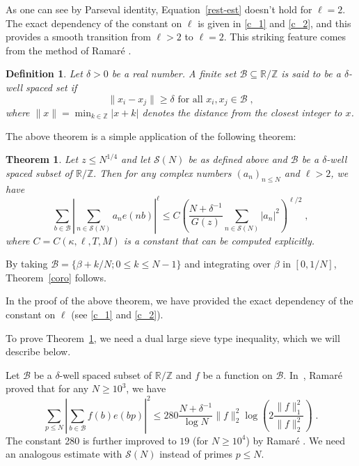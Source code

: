 \documentclass[12pt,article]{amsart}
\newtheorem{theorem}{Theorem}[section]
\newtheorem*{definition}{Definition}
\theoremstyle{remark}
\numberwithin{equation}{section}
\newcommand{\R}{\mathbb{R}}
\newcommand{\Z}{\mathbb{Z}}
\begin{document}
	
	\vspace{2mm}
	\noindent
	As one can see by Parseval identity, Equation~\eqref{rest-est} doesn't hold for $\ell=2$. The exact dependency of the constant on $\ell$ is given in \eqref{c_1} and \eqref{c_2},  and this provides a smooth transition from $\ell>2$  to $\ell=2$.  This striking feature comes from the method of Ramar\'e \cite{ramare24}. 
	
	\vspace{2mm}
	\noindent
	\begin{definition}
		Let $\delta>0$ be a real number. A finite set $\mathcal{B}\subseteq \mathbb{R}/\mathbb{Z}$ is said to be a $\delta$-well spaced set if 
		\[\|x_i-x_j\|\geq \delta \text{ for all } x_i,x_j\in \mathcal{B}\;,\]
		where $\|x\|=\min_{k\in\Z}|x+k|$ denotes the distance from  the closest integer to $x$.
	\end{definition}
	
	The above theorem is a simple application of the following theorem:
	
	\begin{theorem}
		\label{rest-1}
		Let $z\leq N^{1/4}$ and let $\mathcal{S}(N)$ be as defined above and $\mathcal{B}$ be a $\delta$-well spaced subset of $\R/\Z.$ Then for any complex numbers $(a_n)_{n\leq N}$ and $\ell>2$,  we have
		\begin{equation}
			\sum_{b\in \mathcal{B}}\left|\sum_{n\in \mathcal{S}(N)}a_ne(nb)\right|^{\ell}\leq C\left(\frac{N+\delta^{-1}}{G(z)}\sum_{n\in \mathcal{S}(N)}|a_n|^2\right)^{\ell/2}\; ,
		\end{equation}
		where $C=C(\kappa, \ell, T, M)$ is a constant  that can be computed explicitly. 
	\end{theorem}  
	\noindent
	By taking $\mathcal{B}=\{\beta+k/N; 0\leq k\leq N-1\}$ and integrating over $\beta$ in $[0,1/N]$, Theorem~\ref{coro} follows.
	
	
	\vspace{2mm}
	\noindent
	In the proof of the above theorem, we have provided the exact dependency of the constant on $\ell$ (see \eqref{c_1} and \eqref{c_2}).
	
	
	\vspace{2mm}
	\noindent
	To prove Theorem~\ref{rest-1}, we need a dual large sieve type inequality, which we will describe below.
	
	
	\vspace{2mm}
	\noindent
	Let  $\mathcal{B}$ be a $\delta$-well spaced subset of $\mathbb{R}/\mathbb{Z}$ and $f$ be a function on $\mathcal{B}$.  In~\cite{ramare24}, Ramar\'e 
	proved that  for any  $N\geq 10^3$, we have 
	\[\sum_{p\leq N}\left|\sum_{b\in \mathcal{B}}f(b)e(bp)\right|^2\leq 280\frac{N+\delta^{-1}}{\log N}\|f\|_2^2\log\left(2\frac{\|f\|^2_1}{\|f\|_2^2}\right)\;.\]
	The constant 280 is further improved to $19$ (for $N\geq 10^4$) by Ramar\'e \cite[Theorem~6.2]{Ramare*25}.
	We need an analogous  estimate with  $\mathcal{S}(N)$ instead of primes $p\leq N$. 
	
\end{document}
